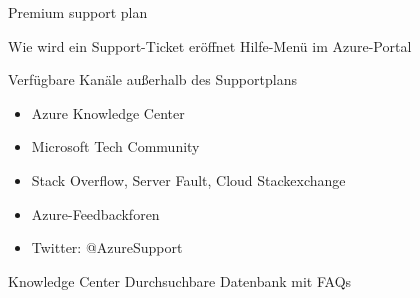 \begin{flashcard}[Understand]{Premium support plan}

\end{flashcard}

\begin{flashcard}[\ ]{Wie wird ein Support-Ticket eröffnet}
    Hilfe-Menü im Azure-Portal
\end{flashcard}

\begin{flashcard}[\ ]{Verfügbare Kanäle außerhalb des Supportplans}
    \begin{itemize}
        \item Azure Knowledge Center
        \item Microsoft Tech Community
        \item Stack Overflow, Server Fault, Cloud Stackexchange
        \item Azure-Feedbackforen
        \item Twitter: @AzureSupport
    \end{itemize}

\end{flashcard}

\begin{flashcard}[Describe]{Knowledge Center}
    Durchsuchbare Datenbank mit FAQs
\end{flashcard}
